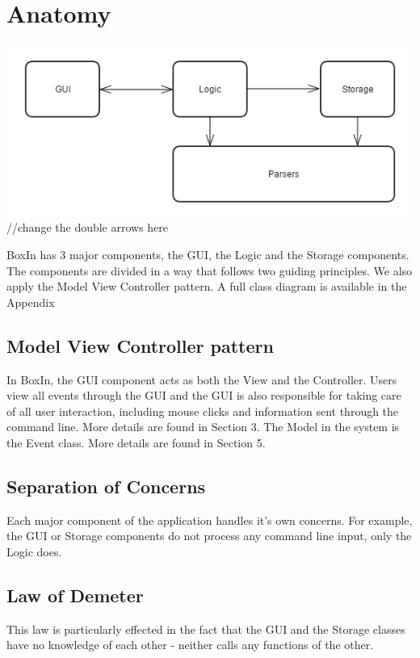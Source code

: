 \documentclass[12pt]{extarticle}
\begin{document}
\newpage

\section{Anatomy}

\includegraphics[width=\textwidth]{architecture} 
//change the double arrows here

BoxIn has 3 major components, the GUI, the Logic and the Storage components. The components are divided in a way that follows two guiding principles. We also apply the Model View Controller pattern. A full class diagram is available in the Appendix

\subsection{Model View Controller pattern}
In BoxIn, the GUI component acts as both the View and the Controller. Users view all events through the GUI and the GUI is also responsible for taking care of all user interaction, including mouse clicks and information sent through the command line. More details are found in Section 3.
The Model in the system is the Event class. More details are found in Section 5.

\subsection{Separation of Concerns}
Each major component of the application handles it's own concerns. For example, the GUI or Storage components do not process any command line input, only the Logic does.

\subsection{Law of Demeter}
This law is particularly effected in the fact that the GUI and the Storage classes have no knowledge of each other - neither calls any functions of the other.
\end{document}

